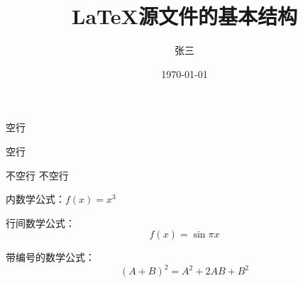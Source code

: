 \documentclass{article} %
\title{\LaTeX 源文件的基本结构}
\author{张三}
\date{\today}
\begin{document}
	\maketitle %
	空行
	
	空行
	
	不空行 %
	不空行
	
	内数学公式：$f(x)=x^3$ %
	
	行间数学公式：$$f(x)=\sin \pi x$$ %
	
	带编号的数学公式：\begin{equation} %
	(A+B)^2=A^2+2AB+B^2%
	\end{equation}
\end{document}
